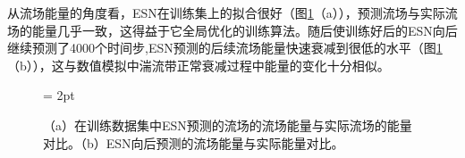 从流场能量的角度看，ESN在训练集上的拟合很好（图\ref{fig:esn_perform}（a）），预测流场与实际流场的能量几乎一致，这得益于它全局优化的训练算法。随后使训练好后的ESN向后继续预测了4000个时间步,ESN预测的后续流场能量快速衰减到很低的水平（图\ref{fig:esn_perform}（b）），这与数值模拟中湍流带正常衰减过程中能量的变化十分相似。

\begin{figure}[H]
	\subfigbottomskip = 2pt
	\begin{minipage}[h]{\linewidth}
	\end{minipage}
	\quad
	\begin{minipage}[h]{\linewidth}
	\end{minipage}
	\quad
	\caption{（a）在训练数据集中ESN预测的流场的流场能量与实际流场的能量对比。（b）ESN向后预测的流场能量与实际能量对比。}
\label{fig:esn_perform}
\end{figure}

